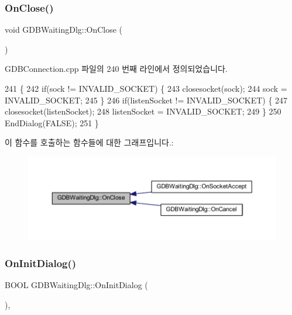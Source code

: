 \subsubsection{\texorpdfstring{On\+Close()}{OnClose()}}
{\footnotesize\ttfamily void G\+D\+B\+Waiting\+Dlg\+::\+On\+Close (\begin{DoxyParamCaption}{ }\end{DoxyParamCaption})\hspace{0.3cm}{\ttfamily [protected]}}



G\+D\+B\+Connection.\+cpp 파일의 240 번째 라인에서 정의되었습니다.


\begin{DoxyCode}
241 \{
242   \textcolor{keywordflow}{if}(sock != INVALID\_SOCKET) \{
243     closesocket(sock);
244     sock = INVALID\_SOCKET;
245   \}
246   \textcolor{keywordflow}{if}(listenSocket != INVALID\_SOCKET) \{
247     closesocket(listenSocket);
248     listenSocket = INVALID\_SOCKET;
249   \}
250   EndDialog(FALSE);
251 \}
\end{DoxyCode}
이 함수를 호출하는 함수들에 대한 그래프입니다.\+:
\nopagebreak
\begin{figure}[H]
\begin{center}
\leavevmode
\includegraphics[width=350pt]{class_g_d_b_waiting_dlg_a9f08e30520f95b333ba224ebd41c47e3_icgraph}
\end{center}
\end{figure}
\mbox{\label{class_g_d_b_waiting_dlg_a9709c0dd18068bfc9f3e9b0c06f1b6d6}} 
\subsubsection{\texorpdfstring{On\+Init\+Dialog()}{OnInitDialog()}}
{\footnotesize\ttfamily B\+O\+OL G\+D\+B\+Waiting\+Dlg\+::\+On\+Init\+Dialog (\begin{DoxyParamCaption}{ }\end{DoxyParamCaption})\hspace{0.3cm}{\ttfamily [protected]}, {\ttfamily [virtual]}}



